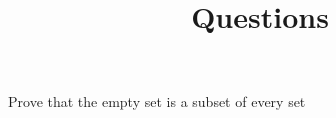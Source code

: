 \documentclass[a4paper, 10pt]{article}
\title{Questions}
\begin{document}
\begin{problem}
Prove that the empty set is a subset of every set
\end{problem}
\begin{solution}
\end{solution}
\begin{problem}
\end{problem}
\begin{solution}
\end{solution}
\begin{problem}
\end{problem}
\begin{solution}
\end{solution}
\begin{problem}
\end{problem}
\begin{solution}
\end{solution}
\begin{problem}
\end{problem}
\begin{solution}
\end{solution}
\begin{problem}
\end{problem}
\begin{solution}
\end{solution}
\begin{problem}
\end{problem}
\begin{solution}
\end{solution}
\begin{problem}
\end{problem}
\begin{solution}
\end{solution}
\begin{problem}
\end{problem}
\begin{solution}
\end{solution}
\begin{problem}
\end{problem}
\begin{solution}
\end{solution}
\begin{problem}
\end{problem}
\begin{solution}
\end{solution}
\begin{problem}
\end{problem}
\end{document}
